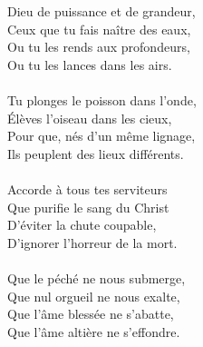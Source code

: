 Dieu de puissance et de grandeur,\\
Ceux que tu fais naître des eaux,\\
Ou tu les rends aux profondeurs,\\
Ou tu les lances dans les airs.\\
\\
Tu plonges le poisson dans l’onde,\\
Élèves l’oiseau dans les cieux,\\
Pour que, nés d’un même lignage,\\
Ils peuplent des lieux différents.\\
\\
Accorde à tous tes serviteurs\\
Que purifie le sang du Christ\\
D’éviter la chute coupable,\\
D’ignorer l’horreur de la mort.\\
\\
Que le péché ne nous submerge,\\
Que nul orgueil ne nous exalte,\\
Que l’âme blessée ne s’abatte,\\
Que l’âme altière ne s’effondre.